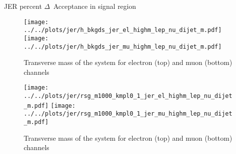 \documentclass{article}
\begin{document}
\scriptsize

\begin{table}[htbp]
  \centering
  \caption{JER percent $\Delta$~Acceptance in signal region}
\end{table}


\begin{figure}[h]
  \centering
  \texttt{[image: ../../plots/jer/h\_bkgds\_jer\_el\_highm\_lep\_nu\_dijet\_m.pdf]}
  \texttt{[image: ../../plots/jer/h\_bkgds\_jer\_mu\_highm\_lep\_nu\_dijet\_m.pdf]}
  
  \caption{Transverse mass of the system for electron (top) and muon (bottom) channels}
\end{figure}

\begin{figure}[h]
  \centering
  \texttt{[image: ../../plots/jer/rsg\_m1000\_kmpl0\_1\_jer\_el\_highm\_lep\_nu\_dijet\_m.pdf]}
  \texttt{[image: ../../plots/jer/rsg\_m1000\_kmpl0\_1\_jer\_mu\_highm\_lep\_nu\_dijet\_m.pdf]}
  
  \caption{Transverse mass of the system for electron (top) and muon (bottom) channels}
\end{figure}
\end{document}
